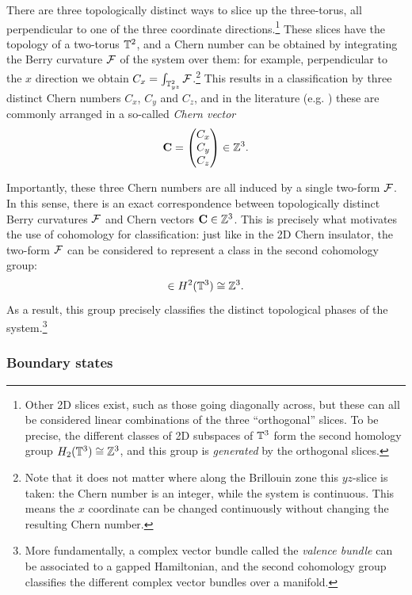 There are three topologically distinct ways to slice up the three-torus, all perpendicular to one of the three coordinate directions.\footnote{
	Other 2D slices exist, such as those going diagonally across, but these can all be considered linear combinations of the three ``orthogonal'' slices. To be precise, the different classes of 2D subspaces of $\mathbb{T}^3$ form the second homology group $H_2(\mathbb{T}^3)\cong\mathbb{Z}^3$, and this group is \emph{generated} by the orthogonal slices.}
These slices have the topology of a two-torus $\mathbb{T}^2$, and a Chern number can be obtained by integrating the Berry curvature $\mathcal{F}$ of the system over them: for example, perpendicular to the $x$ direction we obtain $C_{x} = \int_{\mathbb{T}_{yz}^2}\mathcal{F}$.\footnote{
	Note that it does not matter where along the Brillouin zone this $yz$-slice is taken: the Chern number is an integer, while the system is continuous. This means the $x$ coordinate can be changed continuously without changing the resulting Chern number.}
This results in a classification by three distinct Chern numbers $C_x$, $C_y$ and $C_z$, and in the literature (e.g. \cites{Vanderbilt_2018}{Liu_photonic-Chern-vector}) these are commonly arranged in a so-called \emph{Chern vector}
\[
	\vb{C} = \begin{pmatrix}
		C_x \\ C_y \\ C_z
	\end{pmatrix} \in \mathbb{Z}^3.
\]

Importantly, these three Chern numbers are all induced by a single two-form $\mathcal{F}$. In this sense, there is an exact correspondence between topologically distinct Berry curvatures $\mathcal{F}$ and Chern vectors $\vb{C}\in\mathbb{Z}^3$. This is precisely what motivates the use of cohomology for classification: just like in the 2D Chern insulator, the two-form $\mathcal{F}$ can be considered to represent a class in the second cohomology group:
\begin{equation}
	[\Fc]\in H^2(\T^3)\cong\Z^3. \label{eq:2nd-cohom-z3}
\end{equation}
As a result, this group precisely classifies the distinct topological phases of the system.\footnote{
	More fundamentally, a complex vector bundle called the \emph{valence bundle} can be associated to a gapped Hamiltonian, and the second cohomology group classifies the different complex vector bundles over a manifold.}

\subsubsection{Boundary states}

